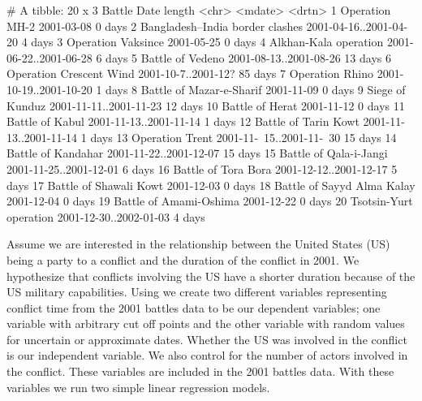 \documentclass[
]{jss}
\begin{document}
\begin{CodeChunk}
\begin{CodeOutput}
# A tibble: 20 x 3
   Battle                          Date                     length 
   <chr>                           <mdate>                  <drtn> 
 1 Operation MH-2                  2001-03-08                0 days
 2 Bangladesh–India border clashes 2001-04-16..2001-04-20    4 days
 3 Operation Vaksince              2001-05-25                0 days
 4 Alkhan-Kala operation           2001-06-22..2001-06-28    6 days
 5 Battle of Vedeno                2001-08-13..2001-08-26   13 days
 6 Operation Crescent Wind         2001-10-7..2001-12?      85 days
 7 Operation Rhino                 2001-10-19..2001-10-20    1 days
 8 Battle of Mazar-e-Sharif        2001-11-09                0 days
 9 Siege of Kunduz                 2001-11-11..2001-11-23   12 days
10 Battle of Herat                 2001-11-12                0 days
11 Battle of Kabul                 2001-11-13..2001-11-14    1 days
12 Battle of Tarin Kowt            2001-11-13..2001-11-14    1 days
13 Operation Trent                 2001-11-~15..2001-11-~30 15 days
14 Battle of Kandahar              2001-11-22..2001-12-07   15 days
15 Battle of Qala-i-Jangi          2001-11-25..2001-12-01    6 days
16 Battle of Tora Bora             2001-12-12..2001-12-17    5 days
17 Battle of Shawali Kowt          2001-12-03                0 days
18 Battle of Sayyd Alma Kalay      2001-12-04                0 days
19 Battle of Amami-Oshima          2001-12-22                0 days
20 Tsotsin-Yurt operation          2001-12-30..2002-01-03    4 days
\end{CodeOutput}
\end{CodeChunk}

Assume we are interested in the relationship between the United States
(US) being a party to a conflict and the duration of the conflict in
2001. We hypothesize that conflicts involving the US have a shorter
duration because of the US military capabilities. Using 
we create two different variables representing conflict time from the
2001 battles data to be our dependent variables; one variable with
arbitrary cut off points and the other variable with random values for
uncertain or approximate dates. Whether the US was involved in the
conflict is our independent variable. We also control for the number of
actors involved in the conflict. These variables are included in the
2001 battles data. With these variables we run two simple linear
regression models.
\end{document}

